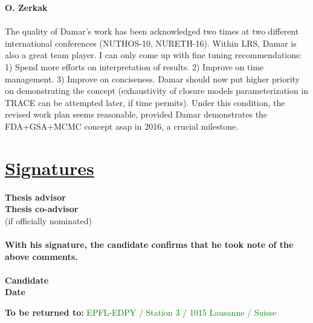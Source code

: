 \documentclass[11pt,titlepage]{article}
\begin{document}
\noindent\textbf{O. Zerkak}\\\\
The quality of Damar’s work has been acknowledged two times at two different international conferences (NUTHOS-10, NURETH-16). Within LRS, Damar is also a great team player. I can only come up with fine tuning recommendations: 1) Spend more efforts on interpretation of results. 2) Improve on time management. 3) Improve on conciseness. Damar should now put higher priority on demonstrating the concept (exhaustivity of closure models parameterization in TRACE can be attempted later, if time permits). Under this condition, the revised work plan seems reasonable, provided Damar demonstrates the FDA+GSA+MCMC concept asap in 2016, a crucial milestone.

\section*{\underline{Signatures}\\}
\noindent \textbf{Thesis advisor}\hspace{6.25cm}\dotfill\vspace{0.5cm}\\

\noindent \textbf{Thesis co-advisor}\hspace{5.7cm}\dotfill\\
\noindent  (if officially nominated)\\\\

\noindent \textbf{With his signature, the candidate confirms that he took note 
                  of the above comments.}\\\\

\noindent \textbf{Candidate}\hspace{7cm}\dotfill\vspace{0.5cm}\\

\noindent \textbf{Date}\hspace{8.05cm}\dotfill\\

\vspace{0.8cm}
\begin{center}
\textbf{To be returned to:} \textcolor{green}{EPFL-EDPY / Station 3 
                                              / 1015 Lausanne / Suisse}
\end{center}

%
\end{document}
